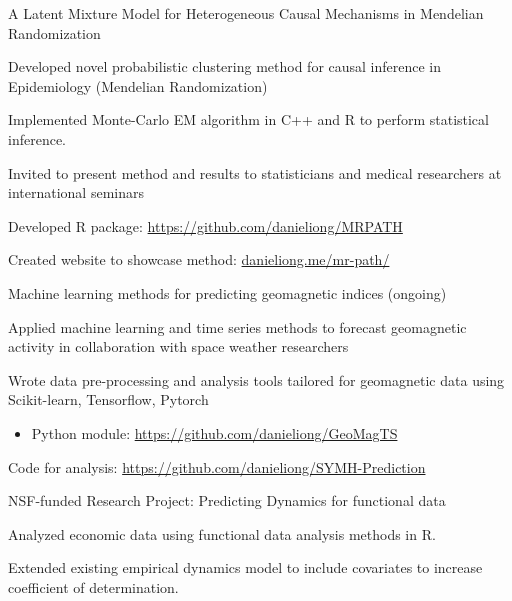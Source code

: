 \documentclass[9pt,a4paper]{altacv}
\begin{document}
\begin{project}{A Latent Mixture Model for Heterogeneous Causal Mechanisms in Mendelian Randomization}{\faChartLine}
  \item Developed novel probabilistic clustering method for causal inference
  in Epidemiology (Mendelian Randomization)
  \item Implemented Monte-Carlo EM algorithm in C++ and R to perform
    statistical inference. 
  \item Invited to present method and results to statisticians and medical
    researchers at international seminars 
  \item[\faGithub] Developed R package: \url{https://github.com/danieliong/MRPATH}
  \item[\faLink] Created website to showcase method: \url{danieliong.me/mr-path/}
\end{project}

\divider

\begin{project}{Machine learning methods for predicting geomagnetic indices (ongoing)}{\faChartLine}
  \item Applied machine learning and time series methods to forecast geomagnetic
  activity in collaboration with space weather researchers
  \item Wrote data pre-processing and analysis tools tailored for geomagnetic
  data using Scikit-learn, Tensorflow, Pytorch
  \vspace{2pt}
  \begin{itemize}[leftmargin=18pt]
    \item[\faGithub] Python module: \url{https://github.com/danieliong/GeoMagTS}
  \end{itemize}
  \item[\faGithub] Code for analysis: \url{https://github.com/danieliong/SYMH-Prediction}  
\end{project}

\vspace{7pt}


\vspace{4pt}

\begin{project}{NSF-funded Research Project: Predicting Dynamics for functional data}{\faChartLine}
  \item Analyzed economic data using functional data analysis methods in R.
  \item Extended existing empirical dynamics model to include covariates to increase coefficient of determination.  
\end{project}
\end{document}
